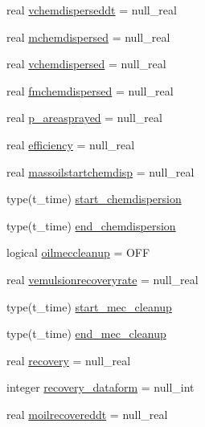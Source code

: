 \begin{DoxyCompactItemize}
real \mbox{\hyperlink{structmoduleoil_1_1t__var_aea763077610355c943636ffa54938486}{vchemdisperseddt}} = null\+\_\+real
\item 
real \mbox{\hyperlink{structmoduleoil_1_1t__var_ab06538a5956dafb94b6e27796c1a5faa}{mchemdispersed}} = null\+\_\+real
\item 
real \mbox{\hyperlink{structmoduleoil_1_1t__var_a646355c1ceb8030af46320c600a1ecd1}{vchemdispersed}} = null\+\_\+real
\item 
real \mbox{\hyperlink{structmoduleoil_1_1t__var_afccf603c5ead0deda1de7b0f8f29376e}{fmchemdispersed}} = null\+\_\+real
\item 
real \mbox{\hyperlink{structmoduleoil_1_1t__var_a517cb71228d46ef35ea2f424dacdc551}{p\+\_\+areasprayed}} = null\+\_\+real
\item 
real \mbox{\hyperlink{structmoduleoil_1_1t__var_a4f3dc1adbbd1b66f1ea5fa3bcb6d35b5}{efficiency}} = null\+\_\+real
\item 
real \mbox{\hyperlink{structmoduleoil_1_1t__var_ae251f12d9bc2f418378b833c2c51f1e8}{massoilstartchemdisp}} = null\+\_\+real
\item 
type(t\+\_\+time) \mbox{\hyperlink{structmoduleoil_1_1t__var_a713c6ebe5b3d7a3146dacece1b937c54}{start\+\_\+chemdispersion}}
\item 
type(t\+\_\+time) \mbox{\hyperlink{structmoduleoil_1_1t__var_ab569261f623e69e1b279c8cb43ca222b}{end\+\_\+chemdispersion}}
\item 
logical \mbox{\hyperlink{structmoduleoil_1_1t__var_a6c289711e8feed6f91f235146468883e}{oilmeccleanup}} = O\+FF
\item 
real \mbox{\hyperlink{structmoduleoil_1_1t__var_a73080a675ef30767f3aa46e63e6673c2}{vemulsionrecoveryrate}} = null\+\_\+real
\item 
type(t\+\_\+time) \mbox{\hyperlink{structmoduleoil_1_1t__var_aec007eb8eae42495ef5b7f6660aecee7}{start\+\_\+mec\+\_\+cleanup}}
\item 
type(t\+\_\+time) \mbox{\hyperlink{structmoduleoil_1_1t__var_a5517bc0ec7593a929709e31517c96eb1}{end\+\_\+mec\+\_\+cleanup}}
\item 
real \mbox{\hyperlink{structmoduleoil_1_1t__var_a005c94573e864e10fd0478650a3d8a26}{recovery}} = null\+\_\+real
\item 
integer \mbox{\hyperlink{structmoduleoil_1_1t__var_a66b4900db78bb10880a7c171be8d56b4}{recovery\+\_\+dataform}} = null\+\_\+int
\item 
real \mbox{\hyperlink{structmoduleoil_1_1t__var_a29527c7fc110f081280bb9844f2c08d9}{moilrecovereddt}} = null\+\_\+real

\end{DoxyCompactItemize}
